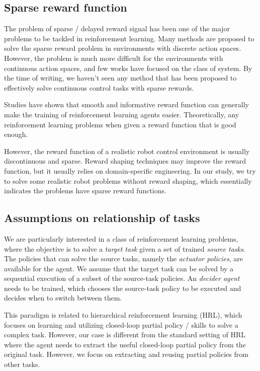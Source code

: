 \subsection{Sparse reward function}
The problem of sparse / delayed reward signal has been one of the major problems to be tackled in reinforcement learning. Many methods are proposed to solve the sparse reward problem in environments with discrete action spaces. However, the problem is much more difficult for the environments with continuous action spaces, and few works have focused on the class of system. By the time of writing, we haven't seen any method that has been proposed to effectively solve continuous control tasks with sparse rewards.

Studies have shown that smooth and informative reward function can generally make the training of reinforcement learning agents easier. Theoretically, any reinforcement learning problems when given a reward function that is good enough.

However, the reward function of a realistic robot control environment is usually discontinuous and sparse. Reward shaping techniques may improve the reward function, but it usually relies on domain-specific engineering. In our study, we try to solve some realistic robot problems without reward shaping, which essentially indicates the problems have sparse reward functions.


\subsection{Assumptions on relationship of tasks}

We are particularly interested in a class of reinforcement learning problems, where the objective is to solve a \textit{target task } given a set of trained \textit{source tasks}. The policies that can solve the source tasks, namely the \textit{actuator policies}, are available for the agent. We assume that the target task can be solved by a sequential execution of a subset of the source-task policies. An \textit{decider agent} needs to be trained, which chooses the source-task policy to be executed and decides when to switch between them.

This paradigm is related to hierarchical reinforcement learning (HRL), which focuses on learning and utilizing closed-loop partial policy / skills to solve a complex task. However, our case is different from the standard setting of HRL where the agent needs to extract the useful closed-loop partial policy from the original task. However, we focus on extracting and reusing partial policies from other tasks.

